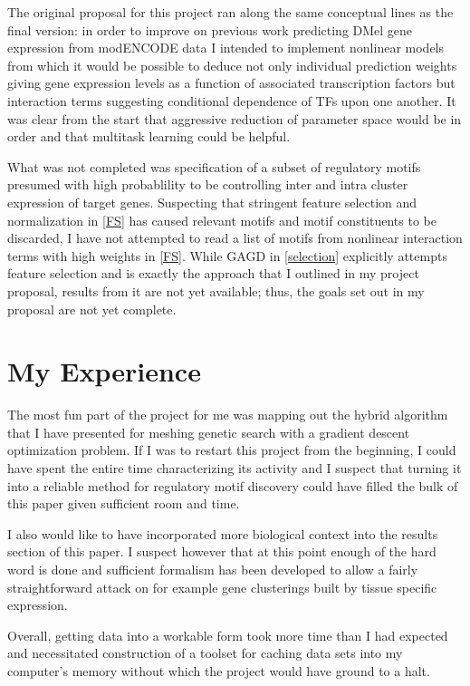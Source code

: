 \documentclass[12pt,a4paper]{article}
\begin{document}
\begin{multicols}{2}
The original proposal for this project ran along the same conceptual lines as the final version: in order to improve on previous work predicting DMel gene expression from modENCODE data I intended to implement nonlinear models from which it would be possible to deduce not only individual prediction weights giving gene expression levels as a function of associated transcription factors but interaction terms suggesting conditional dependence of TFs upon one another. It was clear from the start that aggressive reduction of parameter space would be in order and that multitask learning could be helpful.

What was not completed was specification of a subset of regulatory motifs presumed with high probablility to be controlling inter and intra cluster expression of target genes. Suspecting that stringent feature selection and normalization in \ref{FS} has caused relevant motifs and motif constituents to be discarded, I have not attempted to read a list of motifs from nonlinear interaction terms with high weights in \ref{FS}. While GAGD in \ref{selection} explicitly attempts feature selection and is exactly the approach that I outlined in my project proposal, results from it are not yet available; thus, the goals set out in my proposal are not yet complete.

\section{My Experience}

The most fun part of the project for me was mapping out the hybrid algorithm that I have presented for meshing genetic search with a gradient descent optimization problem. If I was to restart this project from the beginning, I could have spent the entire time characterizing its activity and I suspect that turning it into a reliable method for regulatory motif discovery could have filled the bulk of this paper given sufficient room and time.

I also would like to have incorporated more biological context into the results section of this paper. I suspect however that at this point enough of the hard word is done and sufficient formalism has been developed to allow a fairly straightforward attack on for example gene clusterings built by tissue specific expression. 

Overall, getting data into a workable form took more time than I had expected and necessitated construction of a toolset for caching data sets into my computer's memory without which the project would have ground to a halt.


\end{multicols}
\end{document}
